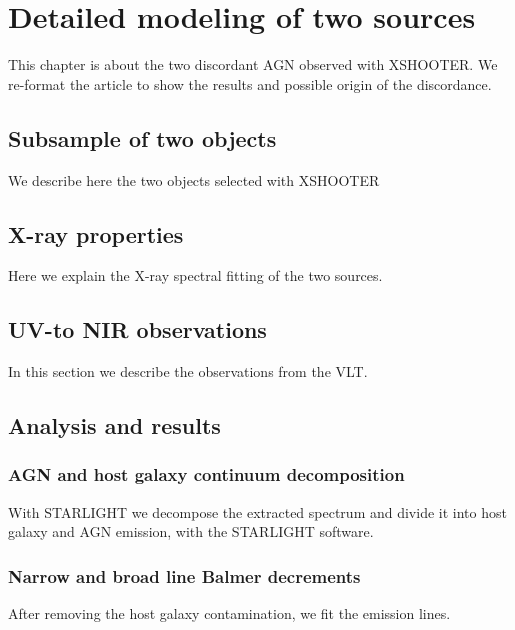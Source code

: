 \chapter{Detailed modeling of two sources} %
\label{chap:xsh}


This chapter is about the two discordant AGN observed with XSHOOTER. We re-format the article to show the results and possible origin of the discordance.


\section{Subsample of two objects}
\label{sec4:samp}
We describe here the two objects selected with XSHOOTER



\section{X-ray properties}
\label{sec4:xray}
Here we explain the X-ray spectral fitting of the two sources.


\section{UV-to NIR observations}
\label{sec4:xsh}
In this section we describe the observations from the VLT.



\section{Analysis and results}
\label{sec4:an}

\subsection{AGN and host galaxy continuum decomposition}
\label{sec4:starlight}

With STARLIGHT we decompose the extracted spectrum and divide it into host galaxy and AGN emission, with the STARLIGHT software.

\subsection{Narrow and broad line Balmer decrements}
\label{sec4:lines}

After removing the host galaxy contamination, we fit the emission lines.

